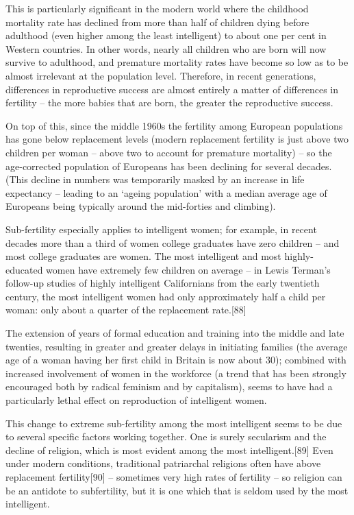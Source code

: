 \documentclass[
]{book}
\begin{document}
This is particularly significant in the modern world where the childhood mortality rate has declined from more than half of children dying before adulthood (even higher among the least intelligent) to about one per cent in Western countries. In other words, nearly all children who are born will now survive to adulthood, and premature mortality rates have become so low as to be almost irrelevant at the population level. Therefore, in recent generations, differences in reproductive success are almost entirely a matter of differences in fertility -- the more babies that are born, the greater the reproductive success.

On top of this, since the middle 1960s the fertility among European populations has gone below replacement levels (modern replacement fertility is just above two children per woman -- above two to account for premature mortality) -- so the age-corrected population of Europeans has been declining for several decades. (This decline in numbers was temporarily masked by an increase in life expectancy -- leading to an `ageing population' with a median average age of Europeans being typically around the mid-forties and climbing).

Sub-fertility especially applies to intelligent women; for example, in recent decades more than a third of women college graduates have zero children -- and most college graduates are women. The most intelligent and most highly-educated women have extremely few children on average -- in Lewis Terman's follow-up studies of highly intelligent Californians from the early twentieth century, the most intelligent women had only approximately half a child per woman: only about a quarter of the replacement rate.{[}88{]}

The extension of years of formal education and training into the middle and late twenties, resulting in greater and greater delays in initiating families (the average age of a woman having her first child in Britain is now about 30); combined with increased involvement of women in the workforce (a trend that has been strongly encouraged both by radical feminism and by capitalism), seems to have had a particularly lethal effect on reproduction of intelligent women.

This change to extreme sub-fertility among the most intelligent seems to be due to several specific factors working together. One is surely secularism and the decline of religion, which is most evident among the most intelligent.{[}89{]} Even under modern conditions, traditional patriarchal religions often have above replacement fertility{[}90{]} -- sometimes very high rates of fertility -- so religion can be an antidote to subfertility, but it is one which that is seldom used by the most intelligent.
\end{document}
